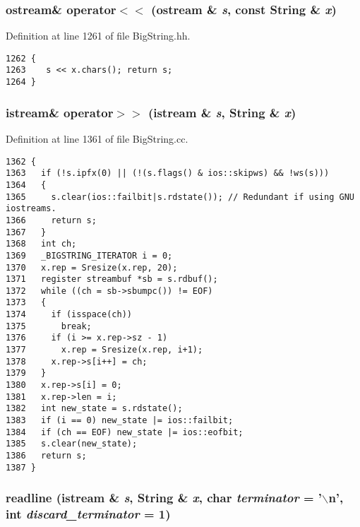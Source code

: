 \subsubsection{\setlength{\rightskip}{0pt plus 5cm}ostream\& operator$<$$<$ (ostream \& {\em s}, const String \& {\em x})\hspace{0.3cm}{\tt  [friend]}}\label{classString_l48}




Definition at line 1261 of file Big\-String.hh.



\footnotesize\begin{verbatim}1262 {
1263    s << x.chars(); return s;
1264 }
\end{verbatim}\normalsize 
{}
\subsubsection{\setlength{\rightskip}{0pt plus 5cm}istream\& operator$>$$>$ (istream \& {\em s}, String \& {\em x})\hspace{0.3cm}{\tt  [friend]}}\label{classString_l50}




Definition at line 1361 of file Big\-String.cc.



\footnotesize\begin{verbatim}1362 {
1363   if (!s.ipfx(0) || (!(s.flags() & ios::skipws) && !ws(s)))
1364   {
1365     s.clear(ios::failbit|s.rdstate()); // Redundant if using GNU iostreams.
1366     return s;
1367   }
1368   int ch;
1369   _BIGSTRING_ITERATOR i = 0;
1370   x.rep = Sresize(x.rep, 20);
1371   register streambuf *sb = s.rdbuf();
1372   while ((ch = sb->sbumpc()) != EOF)
1373   {
1374     if (isspace(ch))
1375       break;
1376     if (i >= x.rep->sz - 1)
1377       x.rep = Sresize(x.rep, i+1);
1378     x.rep->s[i++] = ch;
1379   }
1380   x.rep->s[i] = 0;
1381   x.rep->len = i;
1382   int new_state = s.rdstate();
1383   if (i == 0) new_state |= ios::failbit;
1384   if (ch == EOF) new_state |= ios::eofbit;
1385   s.clear(new_state);
1386   return s;
1387 }
\end{verbatim}\normalsize 
{}
\subsubsection{ readline (istream \& {\em s}, String \& {\em x}, char {\em terminator} = '$\backslash$n', int {\em discard\_\-terminator} = 1)\hspace{0.3cm}{\tt  [friend]}}\label{classString_l51}




